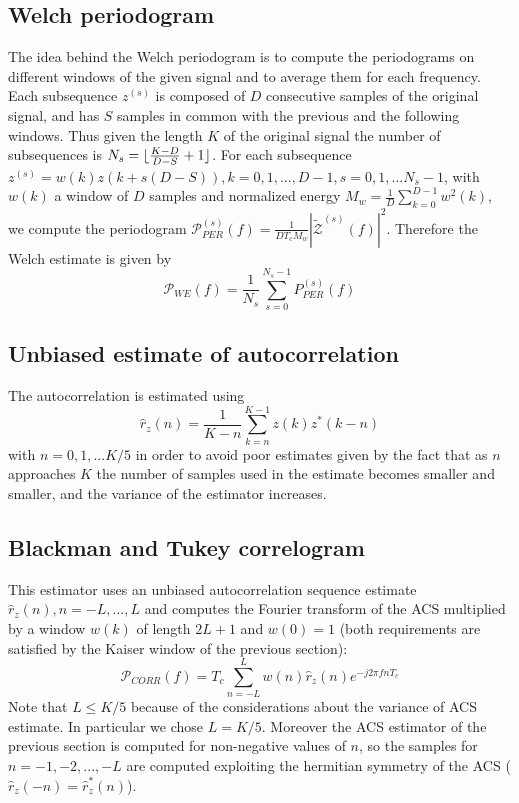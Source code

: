\documentclass[10pt]{article}
\DeclarePairedDelimiter{\floor}{\lfloor}{\rfloor}
\numberwithin{equation}{section}
\begin{document}
\subsection{Welch periodogram}
The idea behind the Welch periodogram is to compute the periodograms on different windows of the given signal and to average them for each frequency. Each subsequence $z^{(s)}$ is composed of $D$ consecutive samples of the original signal, and has $S$ samples in common with the previous and the following windows. Thus given the length $K$ of the original signal the number of subsequences is $N_s = \floor{\frac{K - D}{D - S} + 1}$. For each subsequence $z^{(s)} = w(k)z(k + s(D-S)), k=0,1,..., D- 1, s = 0, 1, ... N_s - 1$, with $w(k)$ a window of $D$ samples and normalized energy $M_w = \frac{1}{D}\sum_{k=0}^{D-1}w^2(k)$, we compute the periodogram $\mathcal{P}_{PER}^{(s)}(f) = \frac{1}{D T_c M_w} |\mathcal{\tilde{Z}}^{(s)}(f)|^2$.
Therefore the Welch estimate is given by
\begin{equation}
  \mathcal{P}_{WE}(f) = \frac{1}{N_s}\sum_{s=0}^{N_s-1}{P}_{PER}^{(s)}(f)
\end{equation}

\subsection{Unbiased estimate of autocorrelation}
The autocorrelation is estimated using
\begin{equation}
  \hat{r}_z(n) = \frac{1}{K - n}\sum_{k=n}^{K-1} z(k) z^*(k-n)
  \label{eq:auto}
\end{equation}
with $n = 0, 1, ... K/5$ in order to avoid poor estimates given by the fact that as $n$ approaches $K$ the number of samples used in the estimate becomes smaller and smaller, and the variance of the estimator increases.

\subsection{Blackman and Tukey correlogram}
This estimator uses an unbiased autocorrelation sequence estimate ${\hat{r}_z(n)}, n = -L, ..., L$ and computes the Fourier transform of the ACS multiplied by a window $w(k)$ of length $2L + 1$ and $w(0)=1$ (both requirements are satisfied by the Kaiser window of the previous section):
\begin{equation}
  \mathcal{P}_{CORR}(f) = T_c\sum_{n=-L}^{L}w(n)\hat{r}_z(n)e^{-j2\pi f n T_c}
\end{equation}
Note that $L \le K/5$ because of the considerations about the variance of ACS estimate. In particular we chose $L = K/5$. Moreover the ACS estimator of the previous section is computed for non-negative values of $n$, so the samples for $n =-1, -2, ..., -L$ are computed exploiting the hermitian symmetry of the ACS ($\hat{r}_z(-n) = \hat{r}_z^*(n)$). \\
\end{document}
